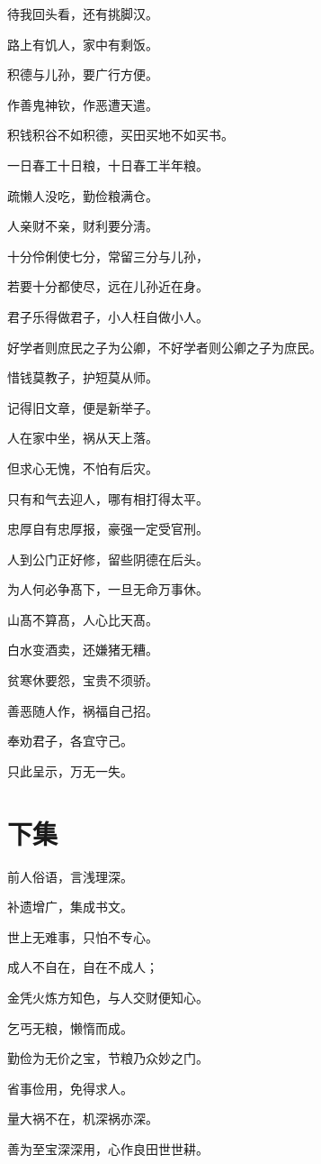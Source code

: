 \documentclass[12pt,oneside]{book}
\begin{document}
待我回头看，还有挑脚汉。

路上有饥人，家中有剩饭。

积德与儿孙，要广行方便。

作善鬼神钦，作恶遭天遣。

积钱积谷不如积德，买田买地不如买书。

一日春工十日粮，十日春工半年粮。

疏懒人没吃，勤俭粮满仓。

人亲财不亲，财利要分淸。

十分伶俐使七分，常留三分与儿孙，

若要十分都使尽，远在儿孙近在身。

君子乐得做君子，小人枉自做小人。

好学者则庶民之子为公卿，不好学者则公卿之子为庶民。

惜钱莫教子，护短莫从师。

记得旧文章，便是新举子。

人在家中坐，祸从天上落。

但求心无愧，不怕有后灾。

只有和气去迎人，哪有相打得太平。

忠厚自有忠厚报，豪强一定受官刑。

人到公门正好修，留些阴德在后头。

为人何必争髙下，一旦无命万事休。

山髙不算髙，人心比天髙。

白水变酒卖，还嫌猪无糟。

贫寒休要怨，宝贵不须骄。

善恶随人作，祸福自己招。

奉劝君子，各宜守己。

只此呈示，万无一失。

\section{下集}
前人俗语，言浅理深。

补遗增广，集成书文。

世上无难事，只怕不专心。

成人不自在，自在不成人；

金凭火炼方知色，与人交财便知心。

乞丐无粮，懒惰而成。

勤俭为无价之宝，节粮乃众妙之门。

省事俭用，免得求人。

量大祸不在，机深祸亦深。

善为至宝深深用，心作良田世世耕。
\end{document}
